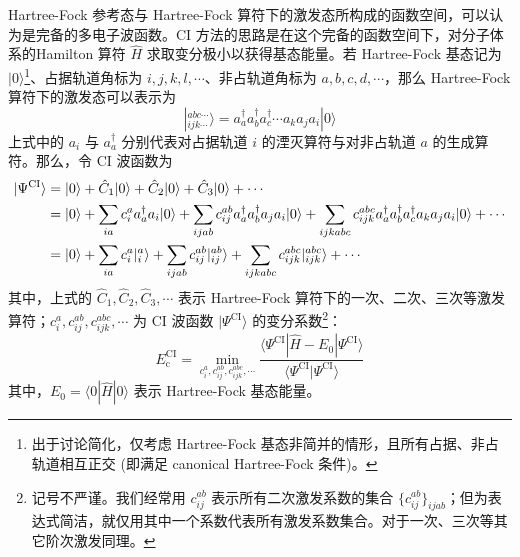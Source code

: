 Hartree-Fock 参考态与 Hartree-Fock 算符下的激发态所构成的函数空间，可以认为是完备的多电子波函数。CI 方法的思路是在这个完备的函数空间下，对分子体系的Hamilton 算符 $\hat H$ 求取变分极小以获得基态能量。若 Hartree-Fock 基态记为 $| 0 \rangle$\footnote{出于讨论简化，仅考虑 Hartree-Fock 基态非简并的情形，且所有占据、非占轨道相互正交 (即满足 canonical Hartree-Fock 条件)。}、占据轨道角标为 $i, j, k, l, \cdots$、非占轨道角标为 $a, b, c, d, \cdots$，那么 Hartree-Fock 算符下的激发态可以表示为
\begin{equation}
  | {}_{ijk\cdots}^{abc\cdots} \rangle = a_a^\dagger a_b^\dagger a_c^\dagger \cdots a_k a_j a_i | 0 \rangle
\end{equation}
上式中的 $a_i$ 与 $a_a^\dagger$ 分别代表对占据轨道 $i$ 的湮灭算符与对非占轨道 $a$ 的生成算符。那么，令 CI 波函数为
\begin{align}
  | \Psi^\text{CI} \rangle &= | 0 \rangle + \hat C_1 | 0 \rangle + \hat C_2 | 0 \rangle + \hat C_3 | 0 \rangle + \cdots \notag\\
  &= | 0 \rangle + \sum_{ia} c_i^a a_a^\dagger a_i | 0 \rangle + \sum_{ijab} c_{ij}^{ab} a_a^\dagger a_b^\dagger a_j a_i | 0 \rangle + \sum_{ijkabc} c_{ijk}^{abc} a_a^\dagger a_b^\dagger a_c^\dagger a_k a_j a_i | 0 \rangle + \cdots \notag\\
  &= | 0 \rangle + \sum_{ia} c_i^a | {}_i^a \rangle + \sum_{ijab} c_{ij}^{ab} | {}_{ij}^{ab} \rangle  + \sum_{ijkabc} c_{ijk}^{abc} | {}_{ijk}^{abc} \rangle + \cdots
\end{align}
其中，上式的 $\hat C_1, \hat C_2, \hat C_3, \cdots$ 表示 Hartree-Fock 算符下的一次、二次、三次等激发算符；$c_i^a, c_{ij}^{ab}, c_{ijk}^{abc}, \cdots$ 为 CI 波函数 $| \Psi^\text{CI} \rangle$ 的变分系数\footnote{记号不严谨。我们经常用 $c_{ij}^{ab}$ 表示所有二次激发系数的集合 $\{ c_{ij}^{ab} \}_{ijab}$；但为表达式简洁，就仅用其中一个系数代表所有激发系数集合。对于一次、三次等其它阶次激发同理。}：
\begin{equation}
  \label{eq.CI-variation}
  E_\mathrm{c}^\mathrm{CI} = \min_{c_i^a, c_{ij}^{ab}, c_{ijk}^{abc}, \cdots} \frac{\langle \Psi^\mathrm{CI} | \hat H - E_0 | \Psi^\mathrm{CI} \rangle}{\langle \Psi^\mathrm{CI} | \Psi^\mathrm{CI} \rangle}
\end{equation}
其中，$E_0 = \langle 0 | \hat H | 0 \rangle$ 表示 Hartree-Fock 基态能量。

